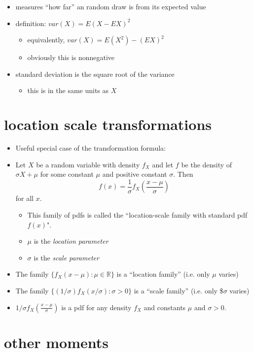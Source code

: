 \begin{itemize}
\item measures ``how far'' an random draw is from its expected value
\item definition: $var(X) = E(X - E X)^2$
\begin{itemize}
\item equivalently, $var(X) = E(X^2) - (EX)^2$
\item obviously this is nonnegative
\end{itemize}
\item standard deviation is the square root of the variance
\begin{itemize}
\item this is in the same units as $X$
\end{itemize}
\end{itemize}

\section{location scale transformations}

\begin{itemize}
\item Useful special case of the transformation formula:
\item Let $X$ be a random variable with density $f_X$ and let $f$ be
      the density of $\sigma X + \mu$ for some constant $\mu$ and
      positive constant $\sigma$.  Then \[f(x) = \frac{1}{\sigma}
      f_X\left(\frac{x - \mu}{\sigma}\right)\] for all $x$.
\begin{itemize}
\item This family of pdfs is called the ``location-scale family
        with standard pdf $f(x)$".
\item $\mu$ is the \emph{location parameter}
\item $\sigma$ is the \emph{scale parameter}
\end{itemize}
\item The family $\{f_X(x - \mu) : \mu \in \mathbb{R}\}$ is a
      ``location family'' (i.e. only $\mu$ varies)
\item The family $\{(1/\sigma) f_X(x/\sigma) : \sigma > 0\}$ is a
      ``scale family'' (i.e. only \$$\sigma$ varies)
\item $1/\sigma f_X(\frac{x - \mu}{\sigma})$ is a pdf for any density
      $f_X$ and constants $\mu$ and $\sigma > 0$.
\end{itemize}

\section{other moments}

